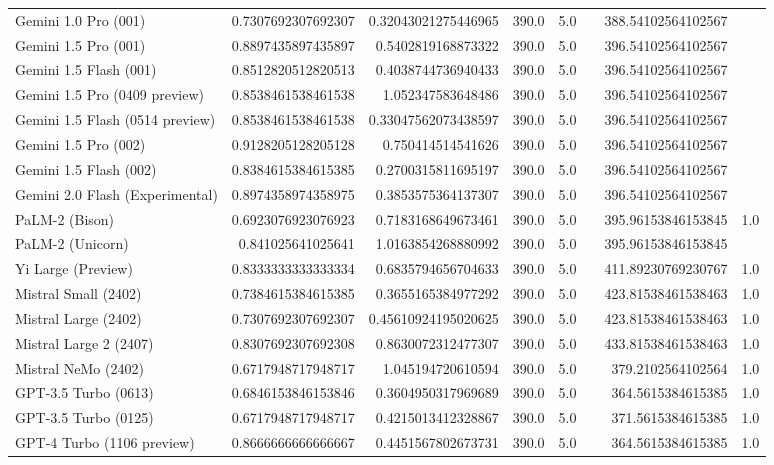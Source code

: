 \begin{table}[htp]
{\begin{tabular}{lrrrrrrr}
Gemini 1.0 Pro (001) & 0.7307692307692307 & 0.32043021275446965 & 390.0 & 5.0 &  & 388.54102564102567 &  \\
Gemini 1.5 Pro (001) & 0.8897435897435897 & 0.5402819168873322 & 390.0 & 5.0 &  & 396.54102564102567 &  \\
Gemini 1.5 Flash (001) & 0.8512820512820513 & 0.4038744736940433 & 390.0 & 5.0 &  & 396.54102564102567 &  \\
Gemini 1.5 Pro (0409 preview) & 0.8538461538461538 & 1.052347583648486 & 390.0 & 5.0 &  & 396.54102564102567 &  \\
Gemini 1.5 Flash (0514 preview) & 0.8538461538461538 & 0.33047562073438597 & 390.0 & 5.0 &  & 396.54102564102567 &  \\
Gemini 1.5 Pro (002) & 0.9128205128205128 & 0.750414514541626 & 390.0 & 5.0 &  & 396.54102564102567 &  \\
Gemini 1.5 Flash (002) & 0.8384615384615385 & 0.2700315811695197 & 390.0 & 5.0 &  & 396.54102564102567 &  \\
Gemini 2.0 Flash (Experimental) & 0.8974358974358975 & 0.3853575364137307 & 390.0 & 5.0 &  & 396.54102564102567 &  \\
PaLM-2 (Bison) & 0.6923076923076923 & 0.7183168649673461 & 390.0 & 5.0 &  & 395.96153846153845 & 1.0 \\
PaLM-2 (Unicorn) & 0.841025641025641 & 1.0163854268880992 & 390.0 & 5.0 &  & 395.96153846153845 &  \\
Yi Large (Preview) & 0.8333333333333334 & 0.6835794656704633 & 390.0 & 5.0 &  & 411.89230769230767 & 1.0 \\
Mistral Small (2402) & 0.7384615384615385 & 0.3655165384977292 & 390.0 & 5.0 &  & 423.81538461538463 & 1.0 \\
Mistral Large (2402) & 0.7307692307692307 & 0.45610924195020625 & 390.0 & 5.0 &  & 423.81538461538463 & 1.0 \\
Mistral Large 2 (2407) & 0.8307692307692308 & 0.8630072312477307 & 390.0 & 5.0 &  & 433.81538461538463 & 1.0 \\
Mistral NeMo (2402) & 0.6717948717948717 & 1.045194720610594 & 390.0 & 5.0 &  & 379.2102564102564 & 1.0 \\
GPT-3.5 Turbo (0613) & 0.6846153846153846 & 0.3604950317969689 & 390.0 & 5.0 &  & 364.5615384615385 & 1.0 \\
GPT-3.5 Turbo (0125) & 0.6717948717948717 & 0.4215013412328867 & 390.0 & 5.0 &  & 371.5615384615385 & 1.0 \\
GPT-4 Turbo (1106 preview) & 0.8666666666666667 & 0.4451567802673731 & 390.0 & 5.0 &  & 364.5615384615385 & 1.0 \\

\end{tabular}}
\end{table}
